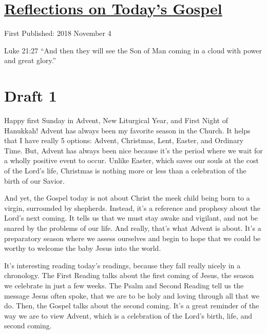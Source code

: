\documentclass[12pt]{article}[titlepage]
\newcommand{\say}[1]{``#1''}
\newcommand{\1}{\={a}}
\newcommand{\2}{\={e}}
\newcommand{\3}{\={\i}}
\newcommand{\4}{\=o}
\newcommand{\5}{\=u}
\newcommand{\6}{\={A}}
\renewcommand{\,}{\textsuperscript{,}}
\begin{document}
\doublespacing
\section{\href{reflections-on-readings-1-advent-c.html}{Reflections on Today's Gospel}}
First Published: 2018 November 4

Luke 21:27 \say{And then they will see the Son of Man coming in a cloud with power and great glory.}

\section{Draft 1}
Happy first Sunday in Advent, New Liturgical Year, and First Night of Hanukkah!
Advent has always been my favorite season in the Church.
It helps that I have really 5 options: Advent, Christmas, Lent, Easter, and Ordinary Time.
But, Advent has always been nice because it's the period where we wait for a wholly positive event to occur.
Unlike Easter, which saves our souls at the cost of the Lord's life, Christmas is nothing more or less than a celebration of the birth of our Savior.

And yet, the Gospel today is not about Christ the meek child being born to a virgin, surrounded by shepherds.
Instead, it's a reference and prophesy about the Lord's next coming.
It tells us that we must stay awake and vigilant, and not be snared by the problems of our life.
And really, that's what Advent is about.
It's a preparatory season where we assess ourselves and begin to hope that we could be worthy to welcome the baby Jesus into the world.

It's interesting reading today's readings, because they fall really nicely in a chronology.
The First Reading talks about the first coming of Jesus, the season we celebrate in just a few weeks.
The Psalm and Second Reading tell us the message Jesus often spoke, that we are to be holy and loving through all that we do.
Then, the Gospel talks about the second coming.
It's a great reminder of the way we are to view Advent, which is a celebration of the Lord's birth, life, and second coming.
\end{document}

